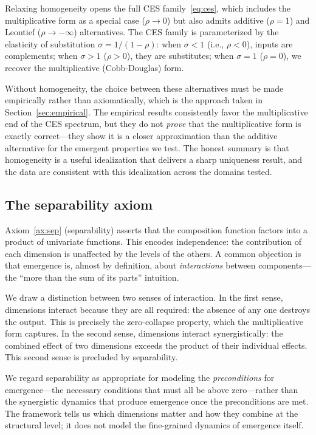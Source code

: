 \documentclass[12pt, a4paper]{article}
\theoremstyle{definition}
\theoremstyle{remark}
\begin{document}
Relaxing homogeneity opens the full CES family~\eqref{eq:ces}, which includes the multiplicative form as a special case ($\rho \to 0$) but also admits additive ($\rho = 1$) and Leontief ($\rho \to -\infty$) alternatives. The CES family is parameterized by the elasticity of substitution $\sigma = 1/(1-\rho)$: when $\sigma < 1$ (i.e., $\rho < 0$), inputs are complements; when $\sigma > 1$ ($\rho > 0$), they are substitutes; when $\sigma = 1$ ($\rho = 0$), we recover the multiplicative (Cobb-Douglas) form.

Without homogeneity, the choice between these alternatives must be made empirically rather than axiomatically, which is the approach taken in Section~\ref{sec:empirical}. The empirical results consistently favor the multiplicative end of the CES spectrum, but they do not \textit{prove} that the multiplicative form is exactly correct---they show it is a closer approximation than the additive alternative for the emergent properties we test. The honest summary is that homogeneity is a useful idealization that delivers a sharp uniqueness result, and the data are consistent with this idealization across the domains tested.

\subsection{The separability axiom}\label{sec:separability}

Axiom~\ref{ax:sep} (separability) asserts that the composition function factors into a product of univariate functions. This encodes independence: the contribution of each dimension is unaffected by the levels of the others. A common objection is that emergence is, almost by definition, about \textit{interactions} between components---the ``more than the sum of its parts'' intuition.

We draw a distinction between two senses of interaction. In the first sense, dimensions interact because they are all required: the absence of any one destroys the output. This is precisely the zero-collapse property, which the multiplicative form captures. In the second sense, dimensions interact synergistically: the combined effect of two dimensions exceeds the product of their individual effects. This second sense is precluded by separability.

We regard separability as appropriate for modeling the \textit{preconditions} for emergence---the necessary conditions that must all be above zero---rather than the synergistic dynamics that produce emergence once the preconditions are met. The framework tells us which dimensions matter and how they combine at the structural level; it does not model the fine-grained dynamics of emergence itself.
\end{document}
